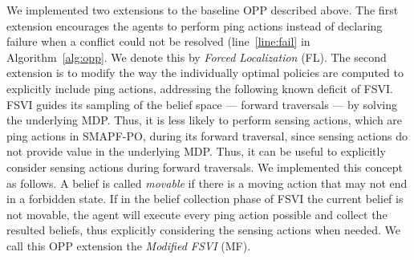 \documentclass[letterpaper]{article} %
\begin{document}
We implemented two extensions to the baseline OPP described above.
The first extension encourages the agents to perform ping actions instead of declaring failure when a conflict could not be resolved (line~\ref{line:fail} in Algorithm~\ref{alg:opp}. We denote this by \emph{Forced Localization} (FL).
The second extension is to modify the way the individually optimal policies are computed to explicitly include ping actions, addressing the following known deficit of FSVI.
FSVI guides its sampling of the belief space --- forward traversals --- by solving the underlying MDP.
Thus, it is less likely to perform sensing actions, which are ping actions in SMAPF-PO, during its forward traversal, since sensing actions do not provide value in the underlying MDP.
Thus, it can be useful to explicitly consider sensing actions during forward traversals.
We implemented this concept as follows.
A belief is called \emph{movable} if there is a moving action that may not end in a forbidden state.
If in the belief collection phase of FSVI the current belief is not movable, the agent will execute every ping action possible and collect the resulted beliefs, thus explicitly considering the sensing actions when needed.
We call this OPP extension the \emph{Modified FSVI} (MF).
\end{document}
